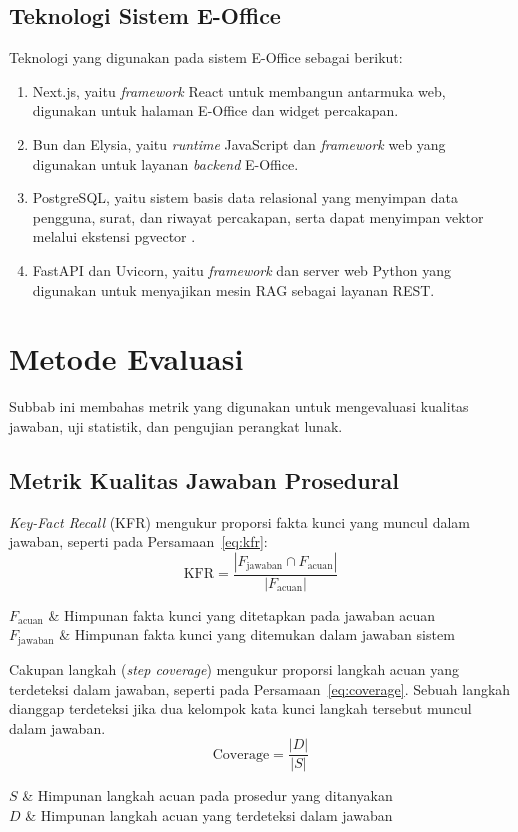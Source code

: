 \subsection{Teknologi Sistem E-Office}
Teknologi yang digunakan pada sistem E-Office sebagai berikut:
\begin{enumerate}
\item Next.js, yaitu \textit{framework} React untuk membangun antarmuka web, digunakan untuk halaman E-Office dan widget percakapan.
\item Bun dan Elysia, yaitu \textit{runtime} JavaScript dan \textit{framework} web yang digunakan untuk layanan \textit{backend} E-Office.
\item PostgreSQL, yaitu sistem basis data relasional yang menyimpan data pengguna, surat, dan riwayat percakapan, serta dapat menyimpan vektor melalui ekstensi pgvector \parencite{pgvector2021}.
\item FastAPI dan Uvicorn, yaitu \textit{framework} dan server web Python yang digunakan untuk menyajikan mesin RAG sebagai layanan REST.
\end{enumerate}

\section{Metode Evaluasi}
\label{sec:metrik}
Subbab ini membahas metrik yang digunakan untuk mengevaluasi kualitas jawaban, uji statistik, dan pengujian perangkat lunak.

\subsection{Metrik Kualitas Jawaban Prosedural}
\textit{Key-Fact Recall} (KFR) mengukur proporsi fakta kunci yang muncul dalam jawaban, seperti pada Persamaan~\ref{eq:kfr}:
\begin{equation}
\mathrm{KFR}=\frac{|F_{\text{jawaban}}\cap F_{\text{acuan}}|}{|F_{\text{acuan}}|}
\label{eq:kfr}
\end{equation}
\begin{keterangan}
$F_{\text{acuan}}$ & Himpunan fakta kunci yang ditetapkan pada jawaban acuan \\
$F_{\text{jawaban}}$ & Himpunan fakta kunci yang ditemukan dalam jawaban sistem \\
\end{keterangan}

Cakupan langkah (\textit{step coverage}) mengukur proporsi langkah acuan yang terdeteksi dalam jawaban, seperti pada Persamaan~\ref{eq:coverage}. Sebuah langkah dianggap terdeteksi jika dua kelompok kata kunci langkah tersebut muncul dalam jawaban.
\begin{equation}
\mathrm{Coverage}=\frac{|D|}{|S|}
\label{eq:coverage}
\end{equation}
\begin{keterangan}
$S$ & Himpunan langkah acuan pada prosedur yang ditanyakan \\
$D$ & Himpunan langkah acuan yang terdeteksi dalam jawaban \\
\end{keterangan}

